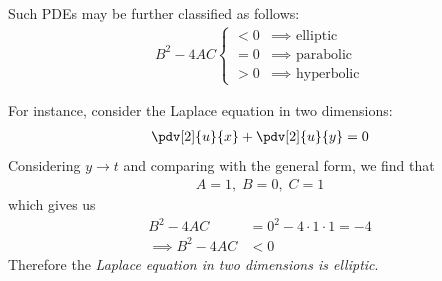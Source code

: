         Such PDEs may be further classified as follows:
        \begin{align*}
            B^2-4AC\begin{cases}
                {<0} & {\implies\text{ elliptic}} \\
                {=0} & {\implies\text{ parabolic}} \\
                {>0} & {\implies\text{ hyperbolic}}
            \end{cases}
        \end{align*}

        For instance, consider the Laplace equation in two dimensions:
        \begin{align*}
            \pdv[2]{u}{x}+\pdv[2]{u}{y}=0
        \end{align*}
        Considering $y\rightarrow t$ and comparing with the general form, we find that
        \begin{align*}
            A=1,\;B=0,\;C=1
        \end{align*}
        which gives us
        \begin{align*}
            B^2-4AC&=0^2-4\cdot 1\cdot 1=-4 \\
            \implies B^2-4AC&<0
        \end{align*}
        Therefore the \textit{Laplace equation in two dimensions is elliptic}.

